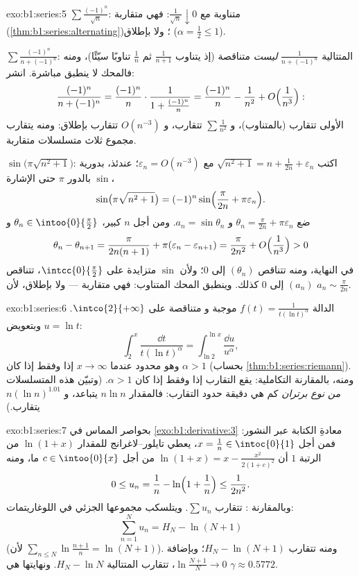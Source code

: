 \begin{solution}{exo:b1:series:5}
$\sum \frac{(-1)^n}{\sqrt n}$: متناوبة مع $\frac{1}{\sqrt n}
\downarrow 0$: فهي متقاربة (\cref{thm:b1:series:alternating})؛ ولا
بإطلاق ($\alpha = \frac12 \leq 1$).

$\sum \frac{(-1)^n}{n + (-1)^n}$: المتتالية $\frac{1}{n +
(-1)^n}$ \emph{ليست} متناقصة (إذ يتناوب $\frac{1}{n+1}$ ثم
$\frac{1}{n}$ تناوبًا سيّئًا)، ومنه فالمحك لا ينطبق مباشرة.
انشر:
\[
\frac{(-1)^n}{n + (-1)^n}
= \frac{(-1)^n}{n}\cdot\frac{1}{1 + \frac{(-1)^n}{n}}
= \frac{(-1)^n}{n} - \frac{1}{n^2} +
O\Bigl(\frac{1}{n^3}\Bigr):
\]
 الأولى تتقارب (بالمتناوب)، و $\sum \frac{1}{n^2}$
تتقارب، و $O(n^{-3})$ تتقارب بإطلاق: ومنه يتقارب مجموع ثلاث
متسلسلات متقاربة.

$\sin\bigl(\pi\sqrt{n^2+1}\bigr)$: اكتب $\sqrt{n^2 + 1} = n +
\frac{1}{2n} + \varepsilon_n$ مع $\varepsilon_n = O(n^{-3})$؛
عندئذ، بدورية $\sin$ بالدور $\pi$ حتى الإشارة،
\[
\sin\bigl(\pi\sqrt{n^2+1}\bigr)
= (-1)^n \sin\Bigl(\frac{\pi}{2n} + \pi\varepsilon_n\Bigr) .
\]
ضع $\theta_n = \frac{\pi}{2n} + \pi\varepsilon_n$ و $a_n =
\sin\theta_n$. ومن أجل $n$ كبير، $\theta_n \in \intoo{0}{\frac\pi2}$
و
\[
\theta_n - \theta_{n+1} = \frac{\pi}{2n(n+1)} +
\pi(\varepsilon_n - \varepsilon_{n+1})
= \frac{\pi}{2n^2} + O\Bigl(\frac{1}{n^3}\Bigr) > 0
\]
في النهاية، ومنه تتناقص $(\theta_n)$ إلى $0$؛ ولأن $\sin$
متزايدة على $\intcc{0}{\frac\pi2}$، تتناقص $(a_n)$ إلى $0$
كذلك. وينطبق المحك المتناوب: فهي متقاربة --- ولا بإطلاق،
لأن $a_n \sim \frac{\pi}{2n}$.
\end{solution}

\begin{solution}{exo:b1:series:6}
الدالة $f(t) = \frac{1}{t(\ln t)^\alpha}$ موجبة  و
متناقصة على $\intco{2}{+\infty}$. وبتعويض $u = \ln t$:
\[
\int_2^x \frac{\dd t}{t(\ln t)^\alpha}
= \int_{\ln 2}^{\ln x} \frac{\dd u}{u^\alpha},
\]
وهو محدود عندما $x \to \infty$ إذا وفقط إذا كان $\alpha > 1$
(بحساب \cref{thm:b1:series:riemann}). ومنه، بالمقارنة
التكاملية: يقع التقارب إذا وفقط إذا كان $\alpha > 1$. (وتبيّن هذه المتسلسلات
\emph{من نوع برتران} كم هي دقيقة حدود التقارب: فالمقدار $n\ln n$
يتباعد، و $n(\ln n)^{1.01}$ يتقارب.)
\end{solution}

\begin{solution}{exo:b1:series:7}
بحواصر المماس في \cref{exo:b1:derivative:3} معادةِ الكتابة
عبر النشور: فمن أجل $x = \frac1n \in \intoc{0}{1}$، يعطي تايلور--لاغرانج
للمقدار $\ln(1+x)$ من الرتبة $1$ أن $\ln(1 + x) = x - \frac{x^2}{2(1 +
c)^2}$ من أجل $c \in \intoo{0}{x}$ ما، ومنه
\[
0 \leq u_n = \frac1n - \ln\Bigl(1 + \frac1n\Bigr) \leq
\frac{1}{2n^2} .
\]
وبالمقارنة : تتقارب $\sum u_n$. ويتلسكب مجموعها
الجزئي في اللوغاريتمات:
\[
\sum_{n=1}^{N} u_n = H_N - \ln(N+1)
\]
(لأن $\sum_{n\leq N} \ln\frac{n+1}{n} = \ln(N+1)$). ومنه تتقارب $H_N -
\ln(N+1)$؛ وبإضافة $\ln\frac{N+1}{N} \to 0$، تتقارب المتتالية
$H_N - \ln N$. ونهايتها هي $\gamma \approx 0.5772$.
\end{solution}

